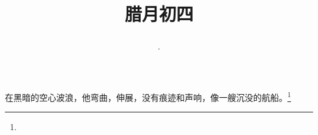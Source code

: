 \title{\date[d=14,m=1,y=2024][year:cn-y,年,month:cn,day:cn,日,·,weekday]·腊月初四 }
在黑暗的空心波浪，他弯曲，伸展，没有痕迹和声响，像一艘沉没的航船。\footnote{ }

